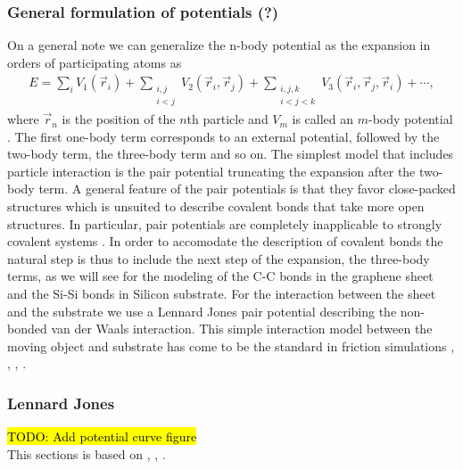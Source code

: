 \subsubsection{General formulation of potentials (?)}
On a general note we can generalize the n-body potential as the expansion in
orders of participating atoms as 
\begin{align*}
  E = \sum_i V_1(\vec{r}_i) + 
      \sum_{\substack{i, j \\ i < j}} V_2(\vec{r}_i, \vec{r}_j) +  
      \sum_{\substack{i,j,k \\ i < j < k}} V_3(\vec{r}_i, \vec{r}_j, \vec{r}_i) + \cdots,
\end{align*} 
where $\vec{r}_n$ is the position of the $n$th particle and $V_m$ is called an
$m$-body potential  \cite{PhysRevB.37.6991}. The first one-body term corresponds
to an external potential, followed by the two-body term, the three-body term and
so on. The simplest model that includes particle interaction is the pair
potential truncating the expansion after the two-body term. A general feature of
the pair potentials is that they favor close-packed structures which is unsuited
to describe covalent bonds that take more open structures. In particular, pair
potentials are completely inapplicable to strongly covalent systems \cite{PhysRevB.37.6991}. In order to accomodate the description
of covalent bonds the natural step is thus to include the next step of the
expansion, the three-body terms, as we will see for the modeling of the C-C bonds in the graphene sheet and the Si-Si bonds in Silicon substrate. For the interaction between
the sheet and the substrate we use a Lennard Jones pair potential
describing the non-bonded van der Waals interaction. This simple interaction model between the moving object and substrate has come to be the standard in friction simulations \cite{zhu_study_2018}, \cite{ZHANG201585}, \cite{Yoon2015MolecularDS}, \cite{kim_nano-scale_2009}. 


\subsubsection{Lennard Jones}
\hl{TODO: Add potential curve figure} \\
This sections is based on \cite{docs_lammps_LJ}, \cite{C9CP05445F}, \cite{chem_libretexts_LJ}.

